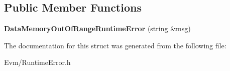 \subsection*{Public Member Functions}
\begin{DoxyCompactItemize}
\item 
\mbox{\label{struct_evm_1_1_data_memory_out_of_range_runtime_error_a7b19bd3e8e2efa7658f08ecf8387a4e3}} 
{\bfseries Data\+Memory\+Out\+Of\+Range\+Runtime\+Error} (string \&msg)
\end{DoxyCompactItemize}


The documentation for this struct was generated from the following file\+:\begin{DoxyCompactItemize}
\item 
Evm/Runtime\+Error.\+h\end{DoxyCompactItemize}

